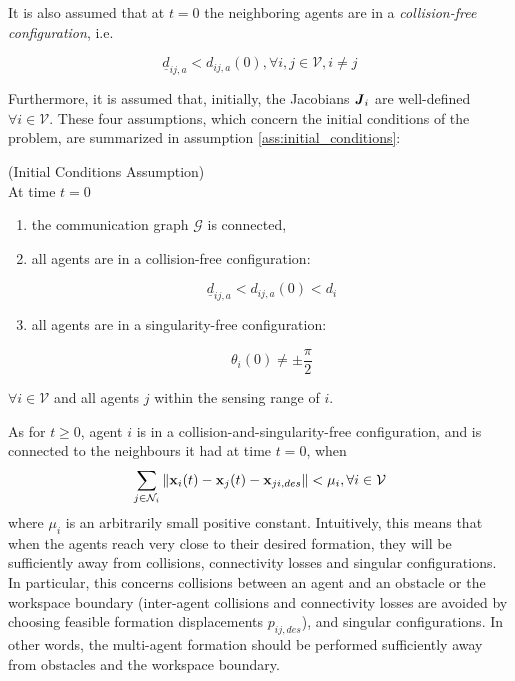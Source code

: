 It is also assumed that at $t=0$ the neighboring agents are in a
\textit{collision-free configuration}, i.e.

\begin{equation}
  \underline{d}_{ij, a} < d_{ij,a}(0), \forall i,j \in \mathcal{V}, i \neq j
\label{eq:initially_coll_free}
\end{equation}

Furthermore, it is assumed that, initially, the Jacobians $\bm{\mathit{J}}_i$ are
well-defined $\forall i \in \mathcal{V}$. These four assumptions, which concern
the initial conditions of the problem, are summarized in assumption
\ref{ass:initial_conditions}:

\begin{gg_box}
\begin{assumption}(Initial Conditions Assumption)\\

  At time $t = 0$

  \begin{enumerate}

	  \item the communication graph $\mathcal{G}$ is connected,

    \item all agents are in a collision-free configuration:

      $$\underline{d}_{ij,a} < d_{ij,a}(0) < d_i$$

    \item all agents are in a singularity-free configuration:

      $$\theta_i(0) \neq \pm \frac{\pi}{2}$$

  \end{enumerate}
  $\forall i \in \mathcal{V}$ and all agents $j$ within the sensing range of $i$.
  \label{ass:initial_conditions}
\end{assumption}
\end{gg_box}


As for $t \geq 0$, agent $i$ is in a collision-and-singularity-free
configuration, and is connected to the neighbours it had at time $t = 0$,
when
$$\sum_{j \in \mathcal{N}_i} \| \bm{\mathbf{x}}_i(t) - \bm{\mathbf{x}}_j(t) - \bm{\mathbf{x}}_{ji,des}\| < \mu_i,
\forall i \in \mathcal{V}$$
where $\mu_i$ is an arbitrarily small positive constant. Intuitively, this
means that when the agents reach very close to their desired formation, they
will be sufficiently away from collisions, connectivity losses and singular
configurations. In particular, this concerns collisions between an agent and
an obstacle or the workspace boundary (inter-agent collisions and connectivity
losses are avoided by choosing feasible formation displacements $p_{ij,des}$),
and singular configurations. In other words, the multi-agent formation should be
performed sufficiently away from obstacles and the workspace boundary.


